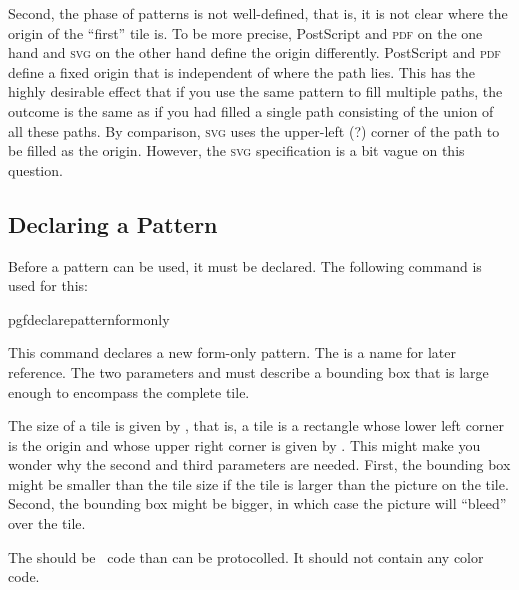 Second, the phase of patterns is not well-defined, that is, it is not
clear where the origin of the ``first'' tile is. To be more precise,
PostScript and \textsc{pdf} on the one hand and \textsc{svg} on the
other hand define the origin differently. PostScript and \textsc{pdf}
define a fixed origin that is independent of where the path lies. This
has the highly desirable effect that if you use the same pattern to
fill multiple paths, the outcome is the same as if you had filled a 
single path consisting of the union of all these paths. By
comparison, \textsc{svg} uses the upper-left (?) corner of the path to
be filled as the origin. However, the \textsc{svg} specification is a
bit vague on this question.


\subsection{Declaring a Pattern}

Before a pattern can be used, it must be declared. The following
command is used for this:

\begin{docCommand}{pgfdeclarepatternformonly}{%
	}

	This command declares a new form-only pattern. The  is a
  name for later reference. The two parameters  and
   must describe a bounding box that is large enough
  to encompass the complete tile.
\end{docCommand}

  The size of a tile is given by , that is, a tile is
  a rectangle whose lower left   corner is the origin and whose upper
  right corner is given by . This might make you
  wonder why the second and third parameters are needed. First, the
  bounding box might be smaller than the tile size if the tile is
  larger than the picture on the tile. Second, the bounding box might
  be bigger, in which case the picture will ``bleed'' over the tile.

  The  should be \pgfname\ code than can be protocolled. It
  should not contain any color code.


\begin{codeexample}[]
{\pgfpointorigin}{\pgfpoint{1cm}{1cm}}
{\pgfpoint{1cm}{1cm}}
{
  \pgftransformshift{\pgfpoint{.5cm}{.5cm}}
  \pgfpathclose%
}
\end{codeexample}

